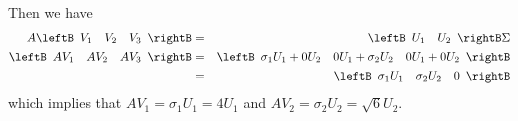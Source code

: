 \begin{solution}
Then we have
\begin{eqnarray*}
A\leftB\begin{array}{ccc} V_1 & V_2 & V_3 \end{array}\rightB
&=& \leftB\begin{array}{cc} U_1 & U_2 \end{array}\rightB\Sigma\\
\leftB\begin{array}{ccc} AV_1 & AV_2 & AV_3 \end{array}\rightB
&=& \leftB\begin{array}{ccc} \sigma_1U_1 + 0U_2 &
0U_1 + \sigma_2 U_2 & 0 U_1 + 0 U_2 \end{array}\rightB \\
&=& \leftB\begin{array}{ccc} \sigma_1U_1 & \sigma_2 U_2 &
0 \end{array}\rightB
\end{eqnarray*}
which implies that $AV_1=\sigma_1U_1 = 4U_1$ and
$AV_2=\sigma_2U_2 = \sqrt 6 U_2$.


\end{solution}
